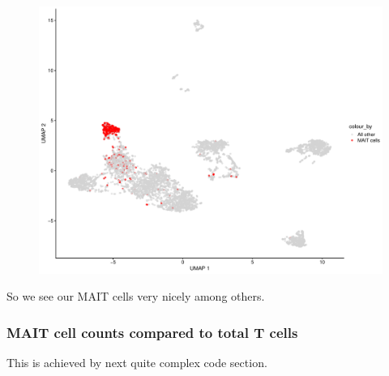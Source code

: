 \documentclass[
  letterpaper,
  DIV=11,
  numbers=noendperiod]{scrartcl}
\begin{document}
\begin{figure}[H]

{\centering \includegraphics{2-Lett-data-SingleR_pdf_files/figure-pdf/unnamed-chunk-10-1.pdf}

}

\end{figure}

So we see our MAIT cells very nicely among others.

\hypertarget{mait-cell-counts-compared-to-total-t-cells}{%
\subsubsection{MAIT cell counts compared to total T
cells}\label{mait-cell-counts-compared-to-total-t-cells}}

This is achieved by next quite complex code section.
\end{document}
